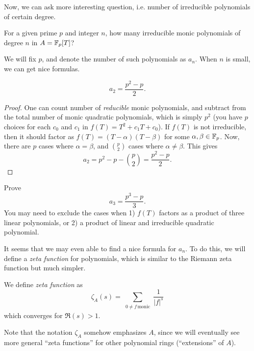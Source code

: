 Now, we can ask more interesting question, i.e. number of irreducible polynomials of certain degree.
\begin{myquote}
    For a given prime $p$ and integer $n$, how many irreducible monic polynomials of degree $n$ in $A = \mathbb{F}_p[T]$?
\end{myquote}
We will fix $p$, and denote the number of such polynomials as $a_n$.
When $n$ is small, we can get nice formulas.
\begin{proposition}
    \label{prop:monic_irred_n2}
    \begin{equation}
        a_2 = \frac{p^2 - p}{2}.
        \label{eqn:monic_irred_n2}
    \end{equation}
\end{proposition}
\begin{proof}
    One can count number of \emph{reducible} monic polynomials, and subtract from the total number of monic quadratic polynomials, which is simply $p^2$ (you have $p$ choices for each $c_0$ and $c_1$ in $f(T) = T^2 + c_1 T + c_0$).
    If $f(T)$ is not irreducible, then it should factor as $f(T) = (T - \alpha)(T - \beta)$ for some $\alpha, \beta \in \mathbb{F}_p$.
    Now, there are $p$ cases where $\alpha = \beta$, and $\binom{p}{2}$ cases where $\alpha \ne \beta$.
    This gives
    \[
    a_2 = p^2 - p - \binom{p}{2} = \frac{p^2 - p}{2}.
    \]
\end{proof}
\begin{exercise}
    Prove
    \begin{equation}
        a_3 = \frac{p^3 - p}{3}.
        \label{eqn:monic_irred_n3}
    \end{equation}
    You may need to exclude the cases when 1) $f(T)$ factors as a product of three linear polynomials, or 2) a product of linear and irreducible quadratic polynomial.
\end{exercise}

It seems that we may even able to find a nice formula for $a_n$.
To do this, we will define a \emph{zeta function} for polynomials, which is similar to the Riemann zeta function but much simpler.
\begin{definition}
    We define \emph{zeta function} as
    \begin{equation}
        \zeta_A(s) = \sum_{\substack{0 \ne f\,\text{monic}}} \frac{1}{|f|^s}
        \label{eqn:zetaA}
    \end{equation}
    which converges for $\Re(s) > 1$.
\end{definition}
Note that the notation $\zeta_A$ somehow emphasizes $A$, since we will eventually see more general ``zeta functions'' for other polynomial rings (``extensions'' of $A$).

